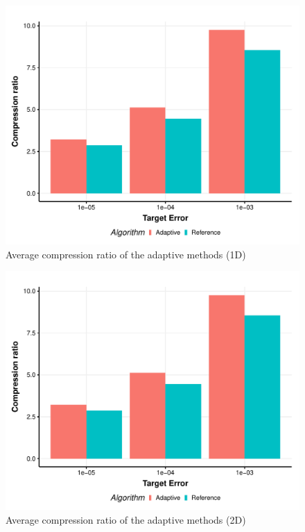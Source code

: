 \documentclass[conference]{IEEEtran}
\theoremstyle{remark}
\begin{document}
\begin{figure}
    \centering
    \includegraphics[width=\linewidth]{Img/adaptive_cr.pdf}
    \caption{Average compression ratio of the adaptive methods (1D)}
    \label{fig:adaptive_cr_1d}
\end{figure}
\begin{figure}
    \centering
    \includegraphics[width=\linewidth]{Img/adaptive_cr.pdf}
    \caption{Average compression ratio of the adaptive methods (2D)}
    \label{fig:adaptive_cr_2d}
\end{figure}
\end{document}
